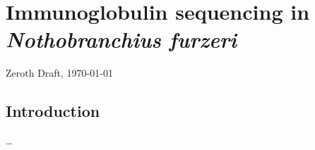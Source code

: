 
\chapter{Immunoglobulin sequencing in \textit{Nothobranchius furzeri}} 
\label{chap:igseq} 
\onehalfspacing

\ifdefineChapter
	{\LARGE Zeroth Draft, \today}
\fi

\pagebreak

\section{Introduction}
\label{sec:igseq_intro}

\dots













